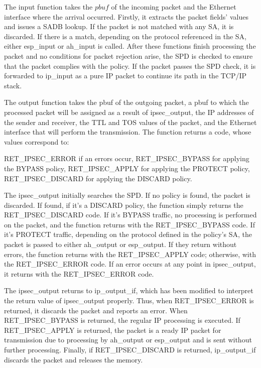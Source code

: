 The input function takes the $pbuf$ of the incoming packet and the Ethernet interface where the arrival occurred. Firstly, it extracts the packet fields' values and issues a SADB lookup. If the packet is not matched with any SA, it is discarded. If there is a match, depending on the protocol referenced in the SA, either esp\_input or ah\_input is called. After these functions finish processing the packet and no conditions for packet rejection arise, the SPD is checked to ensure that the packet complies with the policy. If the packet passes the SPD check, it is forwarded to ip\_input as a pure IP packet to continue its path in the TCP/IP stack.

The output function takes the pbuf of the outgoing packet, a pbuf to which the processed packet will be assigned as a result of ipsec\_output, the IP addresses of the sender and receiver, the TTL and TOS values of the packet, and the Ethernet interface that will perform the transmission. The function returns a code, whose values correspond to:

\begin{outline}
\1 RET\_IPSEC\_ERROR if an errors occur,
\1 RET\_IPSEC\_BYPASS for applying the BYPASS policy,
\1 RET\_IPSEC\_APPLY for applying the PROTECT policy,
\1 RET\_IPSEC\_DISCARD for applying the DISCARD policy.
\end{outline}

The ipsec\_output initially searches the SPD. If no policy is found, the packet is discarded. If found, if it's a DISCARD policy, the function simply returns the RET\_IPSEC\_DISCARD code. If it's BYPASS traffic, no processing is performed on the packet, and the function returns with the RET\_IPSEC\_BYPASS code. If it's PROTECT traffic, depending on the protocol defined in the policy's SA, the packet is passed to either ah\_output or esp\_output. If they return without errors, the function returns with the RET\_IPSEC\_APPLY code; otherwise, with the RET\_IPSEC\_ERROR code. If an error occurs at any point in ipsec\_output, it returns with the RET\_IPSEC\_ERROR code.

The ipsec\_output returns to ip\_output\_if, which has been modified to interpret the return value of ipsec\_output properly. Thus, when RET\_IPSEC\_ERROR is returned, it discards the packet and reports an error. When RET\_IPSEC\_BYPASS is returned, the regular IP processing is executed. If RET\_IPSEC\_APPLY is returned, the packet is a ready IP packet for transmission due to processing by ah\_output or esp\_output and is sent without further processing. Finally, if RET\_IPSEC\_DISCARD is returned, ip\_output\_if discards the packet and releases the memory.



